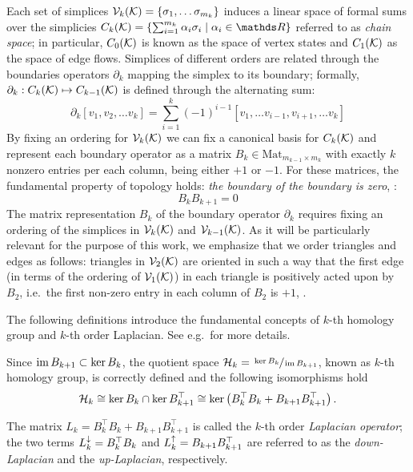 \documentclass{mynotes}
\begin{document}
Each set of simplices \( \mathcal{V}_{k}(\mathcal{K}) = \left\{ \sigma_1, \dots \sigma_{ m_k } \right\} \) induces a linear space of formal sums over the simplicies \( C_k (\mc K) = \left\{  \sum_{i=1}^{ m_k } \alpha_i \sigma_i  \mid \alpha_i \in \ds R \right\} \) referred to as \textit{chain space}; in particular,  \( C_0 ( \mathcal{K} ) \) is known as the space of vertex states and \( C_1 ( \mathcal{K} ) \) as the space of edge flows. Simplices of different orders are related through the boundaries operators \( \partial_k \) mapping the simplex to its boundary; formally, \( \partial_k : C_k ( \mathcal{K} ) \mapsto C_{k-1} ( \mathcal{K} ) \) is defined through the alternating sum:
\begin{equation*}
      \partial_k [ v_1, v_2, \ldots v_k ] = \sum_{i=1}^k (-1)^{i-1} [ v_1, \ldots v_{i-1}, v_{i+1}, \ldots v_k ] 
\end{equation*} 
By fixing an ordering for \( \mathcal{V}_{k}(\mathcal{K}) \) we can fix a canonical basis for \( C_k(\mathcal{K})\) and represent each boundary operator as a matrix  \( B_k \in \mathrm{Mat}_{ m_{k-1} \times m_k } \) with exactly \( k \) nonzero entries per each column, being either \( +1 \) or \( -1 \). For these matrices, the fundamental property of topology holds: \textit{the boundary of the boundary is zero}, {\cite[Thm.~5.7]{Lim15}}:
\begin{equation}
      \label{eq:bkbk1}
      B_k B_{k+1} = 0 
\end{equation}
The matrix representation \( B_k \) of the boundary operator \( \partial_k \) requires fixing an ordering of the simplices in \( \mathcal{V}_{k}(\mathcal{K}) \) and \( \mathcal{V}_{k-1}(\mathcal{K}) \). As it will be particularly relevant for the purpose of this work, we emphasize that we order triangles and edges as follows: triangles in \( \mathcal{V}_{2}(\mathcal{K}) \) are oriented in such a way that the first edge (in terms of the ordering of \( \mathcal{V}_{1}(\mathcal{K}) \)) in each triangle is positively acted upon by \( B_2 \), i.e.\ the first non-zero entry in each column of \(B_2 \) is \( +1 \), . 



The following definitions introduce the fundamental concepts of \(k\)-th homology group and \(k\)-th order Laplacian.  See \cite{Lim15} e.g.\ for more details. 

\begin{definition}
      Since \( \operatorname{im} B_{k+1} \subset \ker B_k \), the quotient space \( \mathcal{H}_k =  \sfrac{ \ker B_k }{ \operatorname{im} B_{k+1}} \), known as \( k\)-th homology group, is correctly defined and the following isomorphisms hold 
    \begin{equation*}
            \mathcal{H}_k \cong \ker B_k \cap \ker B_{k+1}^\top \cong \ker \left( B_k^\top B_k + B_{k+1} B_{k+1}^\top \right).
      \end{equation*}

      The matrix \( L_k = B_k^\top B_k + B_{k+1} B_{k+1}^\top \) is called the \(k\)-th order \emph{Laplacian operator}; the two terms \( L_{k}^{\downarrow} =  B_k^\top B_k \) and \( L_{k}^{\uparrow} = B_{k+1} B_{k+1}^\top \) are referred to as the \emph{down-Laplacian} and the \emph{up-Laplacian}, respectively.
\end{definition}
\end{document}
